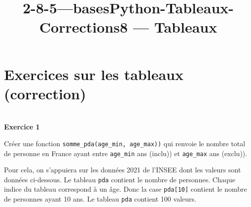 \documentclass[a4paper,17pt]{extarticle}
\title{2-8-5---basesPython-Tableaux-Corrections}
\newenvironment{eleve}%
{\begin{activite}\color{noiramu}\\[-0.5cm]}
{\end{activite}}
\begin{document}
    
    \title{8 --- Tableaux}

    
    

    
    \hypertarget{exercices-sur-les-tableaux-correction}{%
\section{Exercices sur les tableaux
(correction)}\label{exercices-sur-les-tableaux-correction}}
\begin{eleve}
    \textbf{Exercice 1}

Créer une fonction \texttt{somme\_pda(age\_min,\ age\_max))} qui renvoie
le nombre total de personne en France ayant entre \texttt{age\_min} ans
(inclu)) et \texttt{age\_max} ans (exclu)).

Pour cela, on s'appuiera sur les données 2021 de l'INSEE dont les
valeurs sont données ci-dessous. Le tableau \texttt{pda} contient le
nombre de personnes. Chaque indice du tableau correspond à un âge. Donc
la case \texttt{pda{[}10{]}} contient le nombre de personnes ayant 10
ans. Le tableau \texttt{pda} contient 100 valeurs.


\end{eleve}
\end{document}
